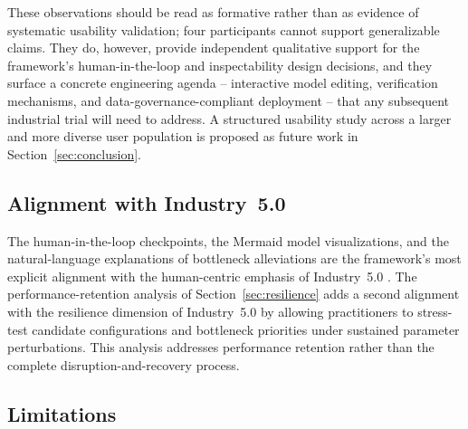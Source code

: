 \documentclass[a4paper,fleqn]{cas-sc}
\begin{document}
  These observations should be read as formative rather than as evidence                                                 
  of systematic usability validation; four participants cannot support
  generalizable claims. They do, however, provide independent qualitative                                                
  support for the framework's human-in-the-loop and inspectability design                                                
  decisions, and they surface a concrete engineering agenda -- interactive                                               
  model editing, verification mechanisms, and data-governance-compliant                                                  
  deployment -- that any subsequent industrial trial will need to address.                                               
  A structured usability study across a larger and more diverse user                                                     
  population is proposed as future work in                                                                               
  Section~\ref{sec:conclusion}. 

  \subsection{Alignment with Industry~5.0}\label{sec:discussion-i5}                                                     
  
  The human-in-the-loop checkpoints, the Mermaid model visualizations, and the natural-language explanations of         
  bottleneck alleviations are the framework's most explicit alignment with the human-centric emphasis of Industry~5.0
  \citep{Toth2023,Xu2021,Turner2022hitl,Hitl2026review}. The performance-retention analysis of Section~\ref{sec:resilience} adds a second alignment with the resilience dimension of Industry~5.0 by allowing practitioners to stress-test candidate configurations and bottleneck priorities under sustained parameter perturbations. This analysis addresses performance retention rather than the complete disruption-and-recovery process.

  \subsection{Limitations}\label{sec:discussion-limits}                                                                 
  
\end{document}
